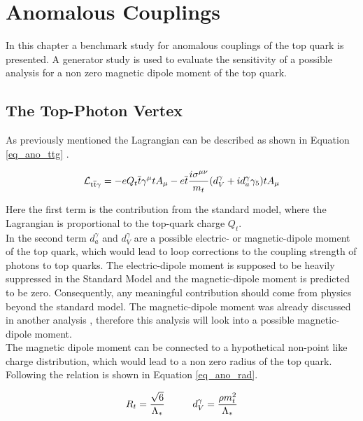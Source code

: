 \chapter{Anomalous Couplings}

In this chapter a benchmark study for anomalous couplings of the top quark is presented. A generator study is used to evaluate the sensitivity of a possible \ttgamma analysis for a non zero magnetic dipole moment of the top quark.
\section{The Top-Photon Vertex}

As previously mentioned  the \ttgamma Lagrangian can be described as shown in  Equation \ref{eq_ano_ttg} \cite{AguilarSaavedra:2008zc}.

\begin{equation}
  \mathcal{L}_{\mathrm{t}\overline{\mathrm{t}} \gamma} = -e Q_t \overline{t} \gamma^{\mu} t A_{\mu} - e \overline{t} \frac{i \sigma^{\mu \nu}}{m_t} (d_V^{\gamma} + i d_a^{\gamma} \gamma_5) t A_{\mu}
  \label{eq_ano_ttg}
  \end{equation}

Here the first term is the contribution from the standard model, where the Lagrangian is proportional to the top-quark charge $Q_t$.\\
In the second term $d_a^{\gamma}$ and $d_V^{\gamma}$ are a possible electric- or  magnetic-dipole moment of the top quark, which would lead to loop corrections to the coupling strength of photons to top quarks. The electric-dipole moment is supposed to be heavily suppressed in the Standard Model \cite{Jersak:1981sp} and the magnetic-dipole moment is predicted to be zero. Consequently, any meaningful contribution should come from physics beyond the standard model. The magnetic-dipole moment was already discussed in another analysis , therefore this analysis will look into a possible magnetic-dipole moment.\\
The  magnetic dipole moment can be connected to a hypothetical non-point like charge distribution, which would lead to a non zero radius of the top quark. Following \cite{Englert:2012by} \cite{Kopp:1994qv} the relation is shown in Equation \ref{eq_ano_rad}.

\begin{equation}
R_t = \frac{\sqrt{6}}{\Lambda_{\ast}} \hspace{1.cm} d_V^{\gamma} = \frac{\rho m_t^2}{\Lambda_{\ast}}
\label{eq_ano_rad}
\end{equation}

